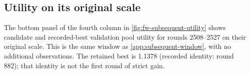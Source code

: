 \subsection{Utility on its original scale}\label{app:subsequent-utility}

The bottom panel of the fourth column in \cref{fig:fw-subsequent-utility}
shows candidate and recorded-best validation pool utility for rounds
2508--2527 on their original scale. This is the same window as
\cref{app:subsequent-window}, with no additional observations. The retained
best is 1.1378 (recorded identity: round 882); that identity is not the first
round of strict gain.
